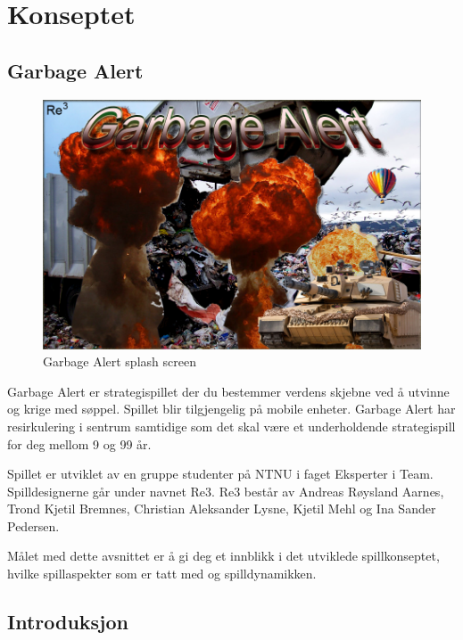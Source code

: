 \section{Konseptet}\label{sec:konsept}

\subsection{Garbage Alert}

			\begin{figure} [here]
				\begin{center}
					\includegraphics[scale=0.5]{images/splashscreen}
				\end{center}
			\caption{Garbage Alert splash screen}
		\end{figure}

Garbage Alert er strategispillet der du bestemmer verdens skjebne ved å utvinne og krige med søppel. Spillet blir tilgjengelig på mobile enheter. Garbage Alert har resirkulering i sentrum samtidige som det skal være et underholdende strategispill for deg mellom 9 og 99 år. 

Spillet er utviklet av en gruppe studenter på NTNU i faget Eksperter i Team. Spilldesignerne går under navnet Re3. Re3 består av Andreas Røysland Aarnes, Trond Kjetil Bremnes, Christian Aleksander Lysne, Kjetil Mehl og Ina Sander Pedersen.

Målet med dette avsnittet er å gi deg et innblikk i det utviklede spillkonseptet,
hvilke spillaspekter som er tatt med og spilldynamikken.

\subsection{Introduksjon}


